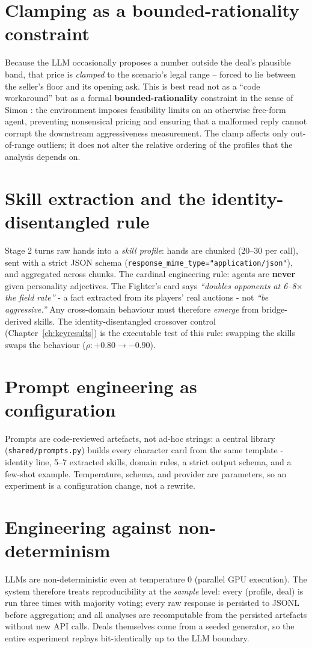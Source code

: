 \documentclass[11pt, a4paper, oneside, openany]{report}
\begin{document}
\section{Clamping as a bounded-rationality constraint}
Because the LLM occasionally proposes a number outside the deal's plausible
band, that price is \emph{clamped} to the scenario's legal range -- forced to
lie between the seller's floor and its opening ask. This is best read not as a
``code workaround'' but as a formal \textbf{bounded-rationality} constraint in
the sense of Simon \cite{simon1955}: the environment imposes feasibility
limits on an otherwise free-form agent, preventing nonsensical pricing and
ensuring that a malformed reply cannot corrupt the downstream aggressiveness
measurement. The clamp affects only out-of-range outliers; it does not alter
the relative ordering of the profiles that the analysis depends on.

\section{Skill extraction and the identity-disentangled rule}
Stage 2 turns raw hands into a \emph{skill profile}: hands are chunked
(20--30 per call), sent with a strict JSON schema
(\texttt{response\_mime\_type="application/json"}), and aggregated across
chunks. The cardinal engineering rule: agents are \textbf{never} given
personality adjectives. The Fighter's card says \emph{``doubles opponents at
6--8$\times$ the field rate''} - a fact extracted from its players' real
auctions - not \emph{``be aggressive.''} Any cross-domain behaviour must
therefore \emph{emerge} from bridge-derived skills. The identity-disentangled
crossover control (Chapter~\ref{ch:keyresults}) is the executable test of this
rule: swapping the skills swaps the behaviour ($\rho: +0.80 \rightarrow -0.90$).

\section{Prompt engineering as configuration}
Prompts are code-reviewed artefacts, not ad-hoc strings: a central library
(\texttt{shared/prompts.py}) builds every character card from the same
template - identity line, 5--7 extracted skills, domain rules, a strict
output schema, and a few-shot example. Temperature, schema, and provider are
parameters, so an experiment is a configuration change, not a rewrite.

\section{Engineering against non-determinism}
LLMs are non-deterministic even at temperature $0$ (parallel GPU execution).
The system therefore treats reproducibility at the \emph{sample} level:
every (profile, deal) is run three times with majority voting; every raw
response is persisted to JSONL before aggregation; and all analyses are
recomputable from the persisted artefacts without new API calls. Deals
themselves come from a seeded generator, so the entire experiment replays
bit-identically up to the LLM boundary.
\end{document}

